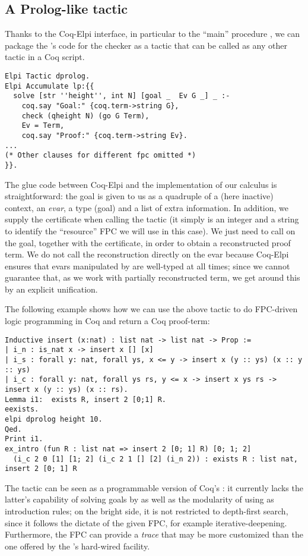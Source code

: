 \subsection{A Prolog-like tactic}

Thanks to the Coq-Elpi interface, in particular to the ``main''
procedure , we can package the \lP's code for the checker
as a tactic that can be called as any other tactic in a Coq script.

\begin{lstlisting}[deletekeywords={goal}]
Elpi Tactic dprolog.
Elpi Accumulate lp:{{
  solve [str ''height'', int N] [goal _  Ev G _] _ :-
    coq.say "Goal:" {coq.term->string G},
    check (qheight N) (go G Term),
    Ev = Term,
    coq.say "Proof:" {coq.term->string Ev}.
...
(* Other clauses for different fpc omitted *)
}}.
\end{lstlisting}

The glue code between Coq-Elpi and the implementation of our calculus
is straightforward: the goal is given to us as a quadruple of a (here
inactive) context, an \emph{evar}, a type (goal) and a list of extra
information. In addition, we supply the certificate  when calling the tactic (it simply is an integer and a string to
identify the ``resource'' FPC we will use in this case). We just need
to call  on the goal, together with the
certificate, in order to obtain a reconstructed proof term. We do not
call the reconstruction directly on the evar because Coq-Elpi
ensures that evars manipulated by \lP are well-typed at all times; since
we cannot guarantee that, as we work with partially reconstructed
term, we  get  around this by an explicit unification.

The following
example shows how we can use the above tactic to do FPC-driven logic
programming in Coq and return a Coq proof-term:
\begin{lstlisting}
Inductive insert (x:nat) : list nat -> list nat -> Prop :=
| i_n : is_nat x -> insert x [] [x]
| i_s : forall y: nat, forall ys, x <= y -> insert x (y :: ys) (x :: y :: ys)
| i_c : forall y: nat, forall ys rs, y <= x -> insert x ys rs -> insert x (y :: ys) (x :: rs).
Lemma i1:  exists R, insert 2 [0;1] R.
eexists.
elpi dprolog height 10.
Qed.
Print i1.
ex_intro (fun R : list nat => insert 2 [0; 1] R) [0; 1; 2]
  (i_c 2 0 [1] [1; 2] (i_c 2 1 [] [2] (i_n 2)) : exists R : list nat, insert 2 [0; 1] R
\end{lstlisting}

The  tactic can be seen as a programmable version of
Coq's : it currently lacks the latter's capability of
solving goals by  as well as the modularity of using
 as introduction rules; on the bright side, it is not
restricted to depth-first search, since it follows the dictate of the
given FPC, for example iterative-deepening. Furthermore, the FPC can
provide a \emph{trace} that may be more customized than the one
offered by the 's hard-wired  facility.

